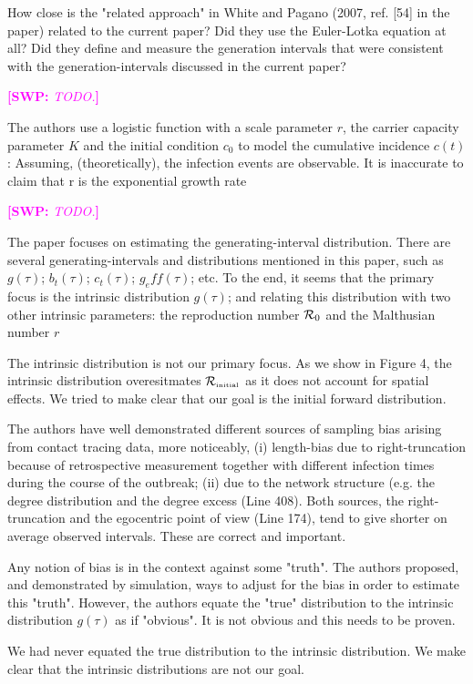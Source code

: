 \documentclass[12pt]{article}
\newcommand{\Rx}[1]{\ensuremath{{\cal R}_{#1}}}
\newcommand{\Ro}{\Rx{0}}
\newcommand{\Rini}{\Rx{\textrm{\tiny initial}}}
\newcommand{\revtext}{\textsf}
\newcommand{\comment}[3]{\textcolor{#1}{\textbf{[#2: }\textsl{#3}\textbf{]}}}
\newcommand{\swp}[1]{\comment{magenta}{SWP}{#1}}
\begin{document}
\revtext{
How close is the "related approach" in White and Pagano
(2007, ref. [54] in the paper) related to the current paper? Did they use the
Euler-Lotka equation at all? Did they define and measure the generation intervals that were consistent with the generation-intervals discussed in
the current paper?
}

\swp{TODO.}

\revtext{
The authors use a logistic function with a scale parameter $r$,
the carrier capacity parameter $K$ and the initial condition $c_0$ to model the
cumulative incidence $c(t)$: Assuming, (theoretically), the infection events
are observable. It is inaccurate to claim that r is the exponential growth
rate
}

\swp{TODO.}

\revtext{
The paper focuses on estimating the generating-interval distribution. There are
several generating-intervals and distributions mentioned in this paper, such as
$g(\tau)$; $b_t(\tau)$; $c_t(\tau)$; $g_eff(\tau)$; etc. To the end, it seems that the primary focus is the
intrinsic distribution $g(\tau)$; and relating this distribution with two other intrinsic
parameters: the reproduction number $\Ro$ and the Malthusian number $r$
}

The intrinsic distribution is not our primary focus. 
As we show in Figure 4, the intrinsic distribution overesitmates $\Rini$ as it does not account for spatial effects.
We tried to make clear that our goal is the initial forward distribution.

\revtext{
The authors have well demonstrated different sources of sampling bias
arising from contact tracing data, more noticeably, (i) length-bias due
to right-truncation because of retrospective measurement together with
different infection times during the course of the outbreak; (ii) due to the
network structure (e.g. the degree distribution and the degree excess (Line
408). Both sources, the right-truncation and the egocentric point of view
(Line 174), tend to give shorter on average observed intervals. These are
correct and important.
}

\revtext{
Any notion of bias is in the context against some "truth". The authors
proposed, and demonstrated by simulation, ways to adjust for the bias in
order to estimate this "truth". However, the authors equate the "true"
distribution to the intrinsic distribution $g(\tau)$ as if "obvious". It is not
obvious and this needs to be proven.
}

We had never equated the true distribution to the intrinsic distribution.
We make clear that the intrinsic distributions are not our goal.
\end{document}

